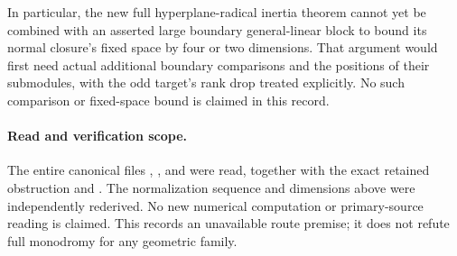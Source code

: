 In particular, the new full hyperplane-radical inertia theorem cannot
yet be combined with an asserted large boundary general-linear block
to bound its normal closure's fixed space by four or two dimensions.
That argument would first need actual additional boundary comparisons
and the positions of their submodules, with the odd target's rank drop
treated explicitly. No such comparison or fixed-space bound is claimed
in this record.

\paragraph{Read and verification scope.}
The entire canonical files
,
, and
were read, together with the exact retained obstruction
and . The normalization
sequence and dimensions above were independently rederived. No new
numerical computation or primary-source reading is claimed. This
records an unavailable route premise; it does not refute full
monodromy for any geometric family.
